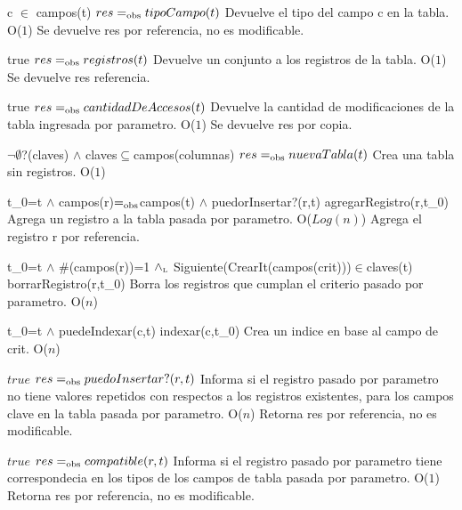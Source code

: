  {c $\in$ campos(t)}
 {$res =_{\mathrm{obs}} tipoCampo(t)$}
 {Devuelve el tipo del campo c en la tabla.}
 {O($1$)}
 {Se devuelve res por referencia, no es modificable.}
 
 {true}
 {$res =_{\mathrm{obs}} registros(t)$}
 {Devuelve un conjunto a los registros de la tabla.}
 {O($1$) }
 {Se devuelve res referencia.}

 
 {true}
 {$res =_{\mathrm{obs}} cantidadDeAccesos(t)$}
 {Devuelve la cantidad de modificaciones de la tabla ingresada por parametro.}
 {O($1$)}
 {Se devuelve res por copia.}

 
 
 {$\neg\emptyset$?(claves) $\land$ claves$\subseteq$campos(columnas)}
 {$res =_{\mathrm{obs}} nuevaTabla(t)$}
 {Crea una tabla sin registros.}
 {O($1$)}
 {}

 {t\_0=t $\land$ campos(r)$=_{\mathrm{obs}}$campos(t) $\land$ puedorInsertar?(r,t)}
 {agregarRegistro(r,t\_0)}
 {Agrega un registro a la tabla pasada por parametro.}
 {O($Log(n)$)}
 {Agrega el registro r por referencia.} 
 
 {t\_0=t $\land$ $\#$(campos(r))=1 $\land_{\mathrm{\scriptscriptstyle{L}}}$ Siguiente(CrearIt(campos(crit)))$\in$claves(t)}
 {borrarRegistro(r,t\_0)}
 {Borra los registros que cumplan el criterio pasado por parametro.}
 {O($n$)}
 {} 
 
 {t\_0=t $\land$ puedeIndexar(c,t)}
 {indexar(c,t\_0)}
 {Crea un indice en base al campo de crit.}
 {O($n$)}
 {} 	
 

 {$true$}
 {$res =_{\mathrm{obs}} puedoInsertar?(r,t)$}
 {Informa si el registro pasado por parametro no tiene valores repetidos con respectos a los registros existentes, para los campos clave en la tabla pasada por parametro.}
 {O($n$)}
 {Retorna res por referencia, no es modificable.} 
 
 {$true$}
 {$res =_{\mathrm{obs}} compatible(r,t)$}
 {Informa si el registro pasado por parametro tiene correspondecia en los tipos de los campos de tabla pasada por parametro.}
 {O($1$)}
 {Retorna res por referencia, no es modificable.} 
 
